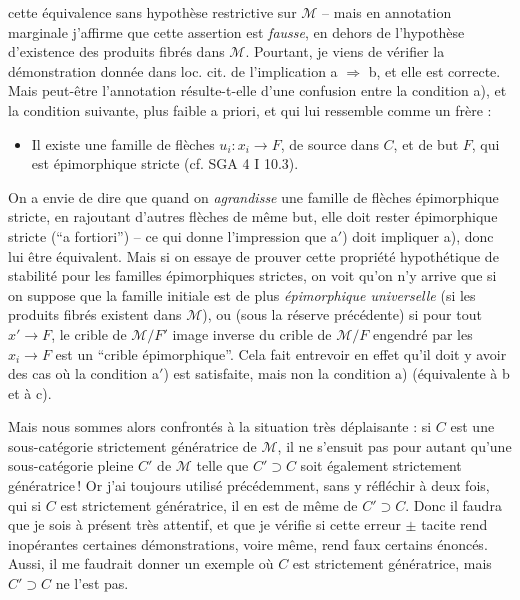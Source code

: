 \documentclass[11pt]{article}
\newcommand{\printedpage}[1]{\marginpar{\footnotesize p.~#1}}
\newcommand{\msp}[1]{\marginpar{\footnotesize [#1]}}
\begin{document}
cette équivalence sans hypothèse restrictive sur $\mathcal{M}$ – mais en annotation marginale j'affirme que cette assertion est \textit{fausse}, en dehors de l'hypothèse d'existence des produits fibrés dans $\mathcal{M}$. Pourtant, je viens de vérifier la démonstration donnée dans loc. cit. de l'implication a $\Longrightarrow$ b, et elle est correcte. Mais peut-être l'annotation résulte-t-elle d'une confusion entre la condition a), et la condition suivante, plus faible a priori, et qui lui ressemble comme un frère :
\begin{itemize}[label={}]
\item[a$'$)] Il existe une famille de flèches $u_i : x_i \longrightarrow F$, de source dans $C$, et de but $F$, qui est épimorphique stricte (cf. SGA 4 I 10.3).
\end{itemize}
On a envie de dire que quand on \textit{agrandisse} une famille de flèches épimorphique stricte, en rajoutant d'autres flèches de même but, elle doit rester épimorphique stricte (“a fortiori”) – ce qui donne l'impression que a$'$) doit impliquer a), donc lui être équivalent. Mais si on essaye de prouver cette propriété hypothétique %
\printedpage{66}
\msp{page 190}
de stabilité pour les familles épimorphiques strictes, on voit qu'on n'y arrive que si on suppose que la famille initiale est de plus \textit{épimorphique universelle} (si les produits fibrés existent dans $\mathcal{M}$), ou (sous la réserve précédente) si pour tout $x' \longrightarrow F$, le crible de $\mathcal{M}/F'$ image inverse du crible de $\mathcal{M}/F$ engendré par les $x_i \longrightarrow F$ est un “crible épimorphique”. Cela fait entrevoir en effet qu'il doit y avoir des cas où la condition a$'$) est satisfaite, mais non la condition a) (équivalente à b et à c).

Mais nous sommes alors confrontés à la situation très déplaisante : si $C$ est une sous-catégorie strictement génératrice de $\mathcal{M}$, il ne s'ensuit pas pour autant qu'une sous-catégorie pleine $C'$ de $\mathcal{M}$ telle que $C' \supset C$ soit également strictement génératrice\,! Or j'ai toujours utilisé précédemment, sans y réfléchir à deux fois, qui si $C$ est strictement génératrice, il en est de même de $C' \supset C$. Donc il faudra que je sois à présent très attentif, %
\msp{page 191}
et que je vérifie si cette erreur $\pm$ tacite rend inopérantes certaines démonstrations, voire même, rend faux certains énoncés. Aussi, il me faudrait donner un exemple où $C$ est strictement génératrice, mais $C' \supset C$ ne l'est pas.
\end{document}
